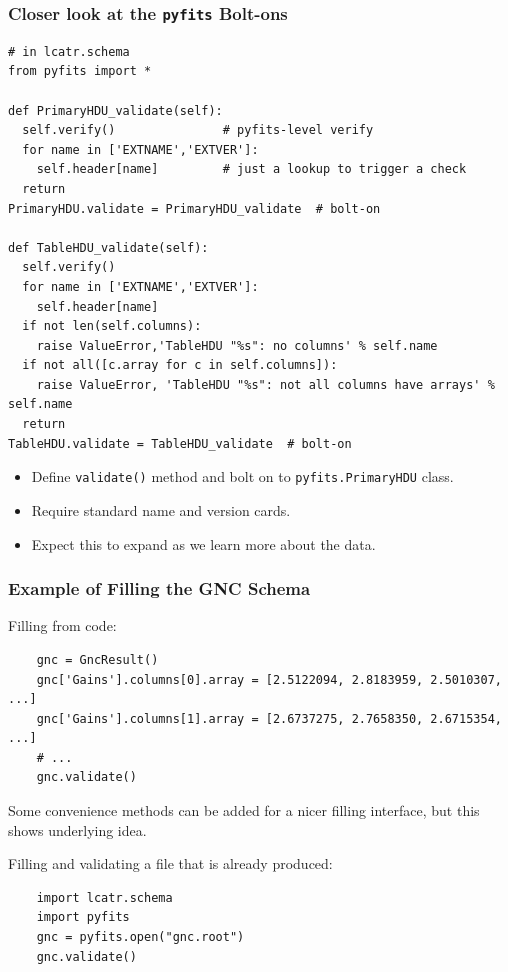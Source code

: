 \documentclass[xcolor=dvipsnames]{beamer}
\begin{document}
\begin{frame}[fragile]
  \frametitle{Closer look at the \texttt{pyfits} Bolt-ons}

  \begin{lstlisting}[emph={PrimaryHDU_validate,TableHDU_validate,PrimaryHDU,TableHDU,validate}]
# in lcatr.schema
from pyfits import *

def PrimaryHDU_validate(self):
  self.verify()               # pyfits-level verify
  for name in ['EXTNAME','EXTVER']: 
    self.header[name]         # just a lookup to trigger a check
  return
PrimaryHDU.validate = PrimaryHDU_validate  # bolt-on

def TableHDU_validate(self):
  self.verify()
  for name in ['EXTNAME','EXTVER']: 
    self.header[name]
  if not len(self.columns):
    raise ValueError,'TableHDU "%s": no columns' % self.name
  if not all([c.array for c in self.columns]):
    raise ValueError, 'TableHDU "%s": not all columns have arrays' % self.name
  return
TableHDU.validate = TableHDU_validate  # bolt-on
  \end{lstlisting}
  \begin{itemize}
  \item Define \texttt{validate()} method and bolt on to \texttt{pyfits.PrimaryHDU} class.
  \item Require standard name and version cards.
  \item Expect this to expand as we learn more about the data.
  \end{itemize}
\end{frame}


\begin{frame}[fragile]
  \frametitle{Example of Filling the GNC Schema}
  
  Filling from code:
  \begin{lstlisting}
    gnc = GncResult()
    gnc['Gains'].columns[0].array = [2.5122094, 2.8183959, 2.5010307, ...]
    gnc['Gains'].columns[1].array = [2.6737275, 2.7658350, 2.6715354, ...]
    # ...
    gnc.validate()
  \end{lstlisting}

  Some convenience methods can be added for a nicer filling interface,
  but this shows underlying idea.

  \vspace{3mm}

  Filling and validating a file that is already produced:

  \begin{lstlisting}
    import lcatr.schema
    import pyfits
    gnc = pyfits.open("gnc.root")
    gnc.validate()
  \end{lstlisting}
\end{frame}
\end{document}
